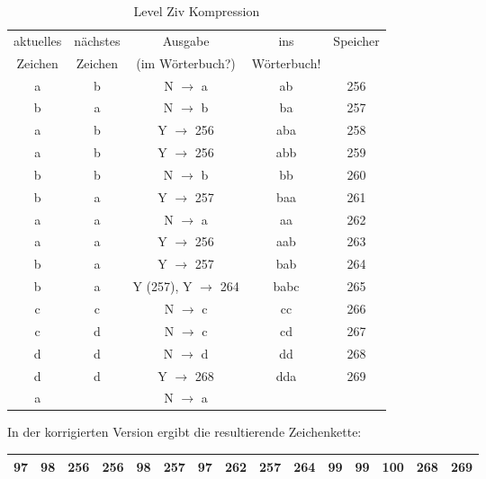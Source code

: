\documentclass[12pt,german]{article}
\begin{document}

\label{fig: manualLemperZivPdf}


\begin{table}[H]
  \centering
  \begin{tabular}{| c | c | c | c | c |}
    \hline
   	aktuelles  & nächstes  & Ausgabe  & ins & Speicher \\
   	 Zeichen &  Zeichen &  (im Wörterbuch?) & Wörterbuch! &  \\
	a & b & N $ \rightarrow $ a & ab & 256 \\
	b & a & N $ \rightarrow $ b & ba & 257 \\
	a & b & Y $ \rightarrow $ 256 & aba & 258 \\
	a & b & Y $ \rightarrow $ 256 & abb & 259 \\
	b & b & N $ \rightarrow $ b & bb & 260 \\
	b & a & Y $ \rightarrow $ 257 & baa & 261 \\
	a & a & N $ \rightarrow $ a & aa & 262 \\
	a & a & Y $ \rightarrow $ 256 & aab & 263 \\
	b & a & Y $ \rightarrow $ 257 & bab & 264 \\
	b & a & Y (257), Y $ \rightarrow $ 264 & babc & 265 \\
	c & c & N $ \rightarrow $ c & cc & 266 \\
	c & d & N $ \rightarrow $ c & cd & 267 \\
	d & d & N $ \rightarrow $ d & dd & 268 \\
	d & d & Y $ \rightarrow $ 268 & dda & 269 \\
	a &   & N $ \rightarrow $ a &     &   \\ 
   	
  \end{tabular}
  \caption{Level Ziv Kompression}
  \label{tab:Level Ziv Kompression}
\end{table}

In der korrigierten Version ergibt die resultierende Zeichenkette: 

\begin{table}[H]
  \centering
  \begin{tabular}{| c | c | c | c | c | c | c | c | c | c | c | c | c | c | c |}
    \hline
    97 & 98& 256 & 256 & 98 & 257 & 97 & 262 & 257 & 264 & 99 & 99 & 100 & 268 & 269 \\
    \hline
  \end{tabular}
\end{table}
\end{document}
